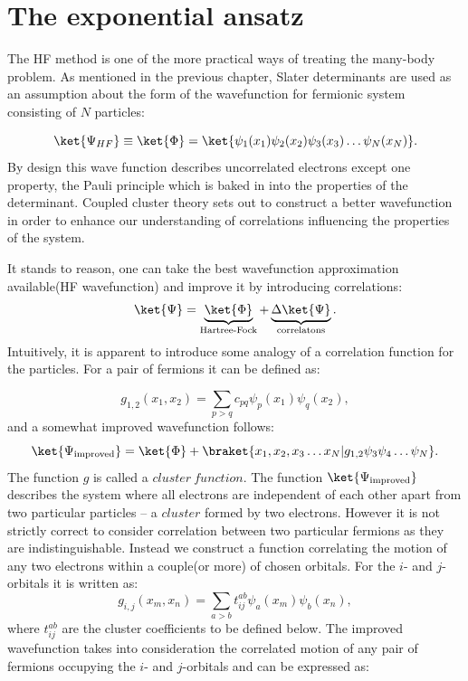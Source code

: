 \documentclass[twoside,english]{uiofysmaster}
\begin{document}
\section{The exponential ansatz}


The HF method is one of the more practical ways of treating the
many-body problem. As mentioned in the previous chapter, Slater
determinants are used as an assumption about the form of the
wavefunction for fermionic system consisting of $N$ particles:

\[
\ket{\Psi_{HF}} \equiv \ket{\Phi} = \ket{\psi_1(x_1) \psi_2(x_2) \psi_3(x_3)  \dots \psi_N(x_N)}.
\]
By design this wave function describes uncorrelated electrons except
one property, the Pauli principle which is baked in into the
properties of the determinant. Coupled cluster theory sets out to
construct a better wavefunction in order to enhance our understanding
of correlations influencing the properties of the system.

It stands to reason, one can take the best wavefunction approximation available(HF wavefunction) and improve it by introducing correlations:
\[
\ket{\Psi} =\underbrace{\ket{\Phi}}_{\text{Hartree-Fock}} + \underbrace{\Delta\ket{\Psi}}_{\text{correlatons}}.
\]
Intuitively, it is apparent to introduce some analogy of a correlation function for the particles. For a pair of fermions it can be defined as:

\[
g_{1,2}(x_1, x_2)=\sum_{p>q}c_{pq}\psi_p(x_1)\psi_q(x_2),
\]
and a somewhat improved wavefunction follows:
\[
\ket{\Psi_{\text{improved}}} = \ket{\Phi} + \braket{x_1, x_2, x_3 \dots x_N|g_{1,2}\psi_3\psi_4 \dots \psi_N}.
\]
The function $g$ is called a
$cluster\ function$. The function $\ket{\Psi_{\text{improved}}}$ describes the
system where all electrons are independent of each other apart from
two particular particles -- a $cluster$ formed by two electrons.
However it is not strictly correct to consider correlation between two
particular fermions as they are indistinguishable. Instead we
construct a function correlating the motion of any two electrons
within a couple(or more) of chosen orbitals. For the $i$- and
$j$-orbitals it is written as:
\begin{equation}\label{eq:orbclustfun}
g_{i,j}(x_m, x_n)=\sum_{a>b}t_{ij}^{ab}\psi_a(x_m)\psi_b(x_n),
\end{equation}
where $t_{ij}^{ab}$ are the cluster coefficients to be defined below.
The improved wavefunction takes into consideration the correlated motion of any pair of fermions occupying the  $i$- and $j$-orbitals and can be expressed as:
\end{document}
